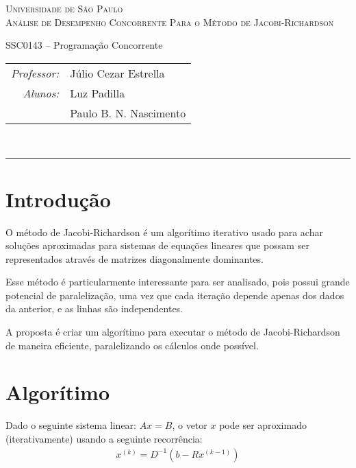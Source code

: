 \documentclass[11pt,towside]{article}
\begin{document}
\begin{titlepage}
\begin{center}

\textsc{\Huge Universidade de São Paulo}\\[5mm]
\textsc{\Large Análise de Desempenho Concorrente Para o Método de Jacobi-Richardson}

\vfill
{\Huge SSC0143 -- Programação Concorrente}
\vfill

\begin{tabular}{rl}
\emph{Professor:}& {\Large Júlio Cezar Estrella} \\[5mm]
\emph{Alunos:}& {\Large Luz Padilla} \\[2mm]
& {\Large Paulo B. N. Nascimento}
\end{tabular}\\[25mm]

\end{center}
\end{titlepage}

\tableofcontents
\vspace{1cm}
\hrule
\vspace{1cm}

\section{Introdução}
O método de Jacobi-Richardson é um algorítimo iterativo usado para achar soluções aproximadas para sistemas de equações lineares que possam ser representados através de matrizes diagonalmente dominantes.

Esse método é particularmente interessante para ser analisado, pois possui grande potencial de paralelização, uma vez que cada iteração depende apenas dos dados da anterior, e as linhas são independentes.

A proposta é criar um algorítimo para executar o método de Jacobi-Richardson de maneira eficiente, paralelizando os cálculos onde possível.
\pagebreak

\section{Algorítimo}
Dado o seguinte sistema linear: $Ax=B$, o vetor $x$ pode ser aproximado (iterativamente) usando a seguinte recorrência:
\begin{align}
\label{eq:rec}
x^{(k)} = D^{-1}(b - Rx^{(k-1)})
\end{align}
\end{document}
